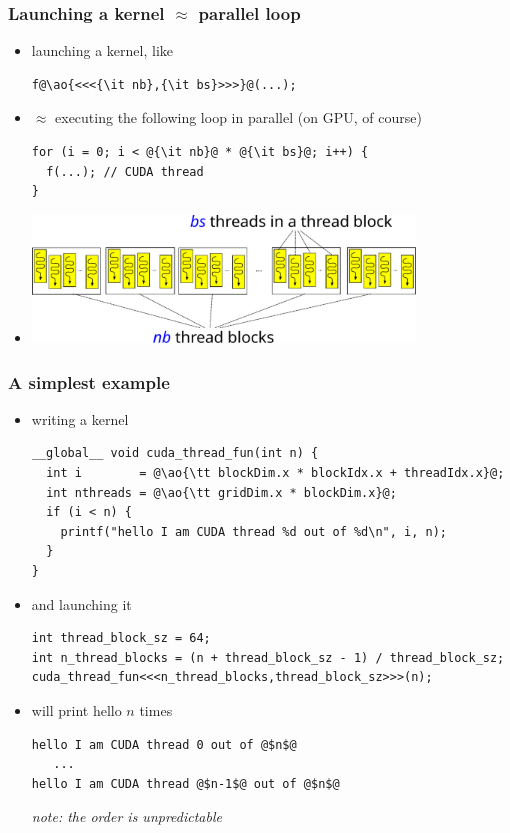 \documentclass[12pt,dvipdfmx]{beamer}
\newcommand{\ao}[1]{{\color{blue}#1}}
\begin{document}
\begin{frame}[fragile]
  \frametitle{Launching a kernel $\approx$ parallel loop}
\begin{itemize}
  \item launching a kernel, like
\begin{lstlisting}
f@\ao{<<<{\it nb},{\it bs}>>>}@(...);
\end{lstlisting}

\item $\approx$ executing the following loop in parallel
  (on GPU, of course)
\begin{lstlisting}
for (i = 0; i < @{\it nb}@ * @{\it bs}@; i++) {
  f(...); // CUDA thread
}
\end{lstlisting}

\item []

  \begin{center}
    \includegraphics[width=0.8\textwidth]{out/pdf/svg/thread_blocks_1.pdf}
  \end{center}
\end{itemize}
\end{frame}

\begin{frame}[fragile]
\frametitle{A simplest example}
\begin{itemize}
\item [] writing a kernel
\begin{lstlisting}
__global__ void cuda_thread_fun(int n) {
  int i        = @\ao{\tt blockDim.x * blockIdx.x + threadIdx.x}@;
  int nthreads = @\ao{\tt gridDim.x * blockDim.x}@;
  if (i < n) {
    printf("hello I am CUDA thread %d out of %d\n", i, n);
  }
}
\end{lstlisting}

\item [] and launching it
\begin{lstlisting}
int thread_block_sz = 64;
int n_thread_blocks = (n + thread_block_sz - 1) / thread_block_sz;
cuda_thread_fun<<<n_thread_blocks,thread_block_sz>>>(n);
\end{lstlisting}

\item [] will print hello $n$ times
\begin{lstlisting}
hello I am CUDA thread 0 out of @$n$@
   ...
hello I am CUDA thread @$n-1$@ out of @$n$@
\end{lstlisting}
{\it note: the order is unpredictable}
\end{itemize}
\end{frame}
\end{document}
